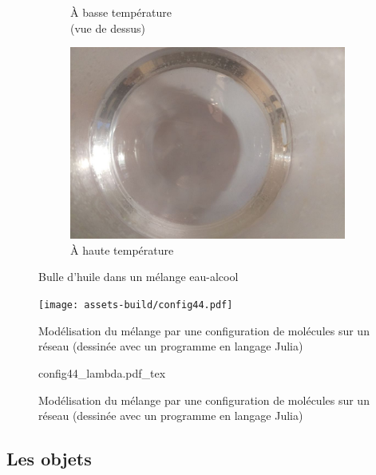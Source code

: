 \documentclass[french]{beamer}
\begin{document}
\begin{frame}
\begin{figure}
\begin{subfigure}{0.32\textwidth}
			\caption{\`A basse température\\(vue de dessus)}
		\end{subfigure}
		\begin{subfigure}{0.32\textwidth}
			\centering
			\includegraphics[height=0.3\textheight]{assets/bulle/IMG_20180612_220259.jpg}
			\caption{\`A haute température\\\phantom{}}
		\end{subfigure}
        \caption{Bulle d'huile dans un mélange eau-alcool}
        \label{fig:miscibilite-bulle}
    \end{figure}
\end{frame}

\frame{\tableofcontents}

\begin{frame}
\begin{figure}
	\centering
	\texttt{[image: assets-build/config44.pdf]}
	\caption{Modélisation du mélange par une configuration de molécules sur un réseau (dessinée avec un programme en langage Julia)}
\end{figure}
\end{frame}

\begin{frame}
\begin{figure}
	\centering
	\def\svgwidth{1\textwidth}
	{config44_lambda.pdf_tex}
	\caption{Modélisation du mélange par une configuration de molécules sur un réseau (dessinée avec un programme en langage Julia)}
\end{figure}
\end{frame}

\subsection{Les objets}
\end{document}
